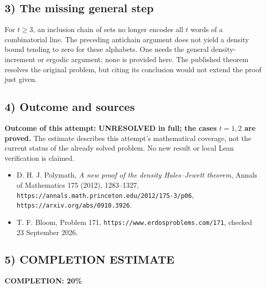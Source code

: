 \subsection{3) The missing general step}
For $t\geq3$, an inclusion chain of sets no longer encodes all $t$
words of a combinatorial line. The preceding antichain argument does
not yield a density bound tending to zero for these alphabets.
One needs the general density-increment or ergodic argument; none is
provided here. The published theorem resolves the original problem,
but citing its conclusion would not extend the proof just given.

\subsection{4) Outcome and sources}
\textbf{Outcome of this attempt: UNRESOLVED in full; the cases $t=1,2$
are proved.} The estimate describes this attempt's mathematical coverage,
not the current status of the already solved problem. No new result or
local Lean verification is claimed.
\begin{itemize}
\item D. H. J. Polymath, \emph{A new proof of the density Hales--Jewett
theorem}, Annals of Mathematics 175 (2012), 1283--1327,
\texttt{https://annals.math.princeton.edu/2012/175-3/p06},
\texttt{https://arxiv.org/abs/0910.3926}.
\item T. F. Bloom, Problem 171,
\texttt{https://www.erdosproblems.com/171}, checked 23 September 2026.
\end{itemize}
\subsection{5) COMPLETION ESTIMATE}
\textbf{COMPLETION: 20\%}

